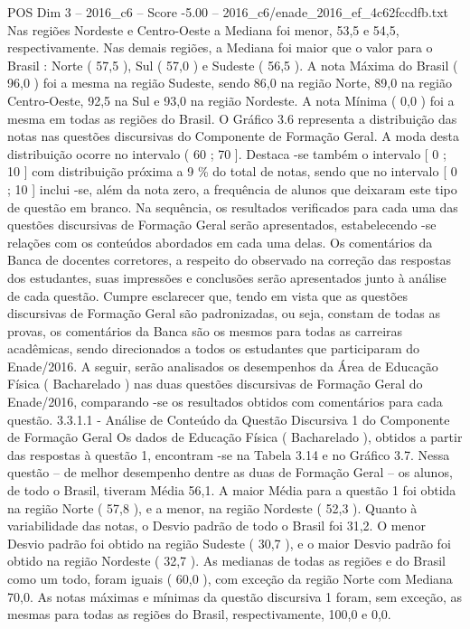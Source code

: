 \begin{textsample}{POS Dim 3 – 2016\_c6 – Score -5.00 – 2016\_c6/enade\_2016\_ef\_4c62fccdfb.txt}
Nas regiões Nordeste e Centro-Oeste a Mediana foi menor, 53,5 e 54,5, respectivamente.
Nas demais regiões, a Mediana foi maior que o valor para o Brasil : Norte ( 57,5 ), Sul ( 57,0 ) e Sudeste ( 56,5 ).
A nota Máxima do Brasil ( 96,0 ) foi a mesma na região Sudeste, sendo 86,0 na região Norte, 89,0 na região Centro-Oeste, 92,5 na Sul e 93,0 na região Nordeste.
A nota Mínima ( 0,0 ) foi a mesma em todas as regiões do Brasil.
O Gráfico 3.6 representa a distribuição das notas nas questões discursivas do Componente de Formação Geral.
A moda desta distribuição ocorre no intervalo ( 60 ; 70 ].
Destaca -se também o intervalo [ 0 ; 10 ] com distribuição próxima a 9 \% do total de notas, sendo que no intervalo [ 0 ; 10 ] inclui -se, além da nota zero, a frequência de alunos que deixaram este tipo de questão em branco.
Na sequência, os resultados verificados para cada uma das questões discursivas de Formação Geral serão apresentados, estabelecendo -se relações com os conteúdos abordados em cada uma delas.
Os comentários da Banca de docentes corretores, a respeito do observado na correção das respostas dos estudantes, suas impressões e conclusões serão apresentados junto à análise de cada questão.
Cumpre esclarecer que, tendo em vista que as questões discursivas de Formação Geral são padronizadas, ou seja, constam de todas as provas, os comentários da Banca são os mesmos para todas as carreiras acadêmicas, sendo direcionados a todos os estudantes que participaram do Enade/2016.
A seguir, serão analisados os desempenhos da Área de Educação Física ( Bacharelado ) nas duas questões discursivas de Formação Geral do Enade/2016, comparando -se os resultados obtidos com comentários para cada questão. 3.3.1.1 - Análise de Conteúdo da Questão Discursiva 1 do Componente de Formação Geral Os dados de Educação Física ( Bacharelado ), obtidos a partir das respostas à questão 1, encontram -se na Tabela 3.14 e no Gráfico 3.7.
Nessa questão – de melhor desempenho dentre as duas de Formação Geral – os alunos, de todo o Brasil, tiveram Média 56,1.
A maior Média para a questão 1 foi obtida na região Norte ( 57,8 ), e a menor, na região Nordeste ( 52,3 ).
Quanto à variabilidade das notas, o Desvio padrão de todo o Brasil foi 31,2.
O menor Desvio padrão foi obtido na região Sudeste ( 30,7 ), e o maior Desvio padrão foi obtido na região Nordeste ( 32,7 ).
As medianas de todas as regiões e do Brasil como um todo, foram iguais ( 60,0 ), com exceção da região Norte com Mediana 70,0.
As notas máximas e mínimas da questão discursiva 1 foram, sem exceção, as mesmas para todas as regiões do Brasil, respectivamente, 100,0 e 0,0.

\end{textsample}
